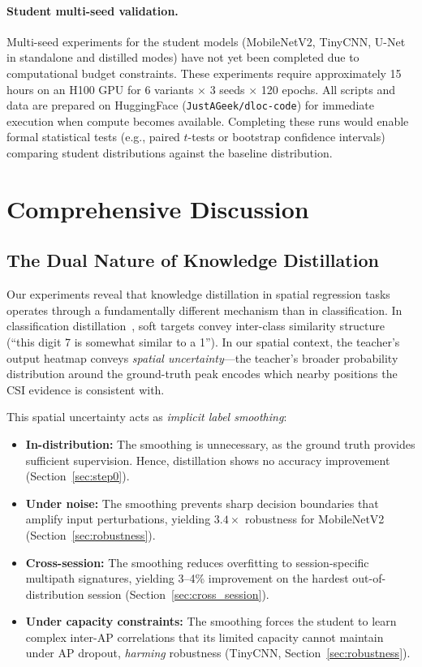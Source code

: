 \documentclass[11pt,a4paper]{article}
\begin{document}
\paragraph{Student multi-seed validation.}
Multi-seed experiments for the student models (MobileNetV2, TinyCNN, U-Net in standalone and distilled modes) have not yet been completed due to computational budget constraints.
These experiments require approximately 15 hours on an H100 GPU for 6 variants $\times$ 3 seeds $\times$ 120 epochs.
All scripts and data are prepared on HuggingFace (\texttt{JustAGeek/dloc-code}) for immediate execution when compute becomes available.
Completing these runs would enable formal statistical tests (e.g., paired $t$-tests or bootstrap confidence intervals) comparing student distributions against the baseline distribution.


\section{Comprehensive Discussion}
\label{sec:discussion}

\subsection{The Dual Nature of Knowledge Distillation}

Our experiments reveal that knowledge distillation in spatial regression tasks operates through a fundamentally different mechanism than in classification.
In classification distillation~\cite{hinton2015distilling}, soft targets convey inter-class similarity structure (``this digit 7 is somewhat similar to a 1'').
In our spatial context, the teacher's output heatmap conveys \emph{spatial uncertainty}---the teacher's broader probability distribution around the ground-truth peak encodes which nearby positions the CSI evidence is consistent with.

This spatial uncertainty acts as \emph{implicit label smoothing}:
\begin{itemize}[nosep]
  \item \textbf{In-distribution:} The smoothing is unnecessary, as the ground truth provides sufficient supervision. Hence, distillation shows no accuracy improvement (Section~\ref{sec:step0}).
  \item \textbf{Under noise:} The smoothing prevents sharp decision boundaries that amplify input perturbations, yielding $3.4\times$ robustness for MobileNetV2 (Section~\ref{sec:robustness}).
  \item \textbf{Cross-session:} The smoothing reduces overfitting to session-specific multipath signatures, yielding 3--4\% improvement on the hardest out-of-distribution session (Section~\ref{sec:cross_session}).
  \item \textbf{Under capacity constraints:} The smoothing forces the student to learn complex inter-AP correlations that its limited capacity cannot maintain under AP dropout, \emph{harming} robustness (TinyCNN, Section~\ref{sec:robustness}).
\end{itemize}
\end{document}
